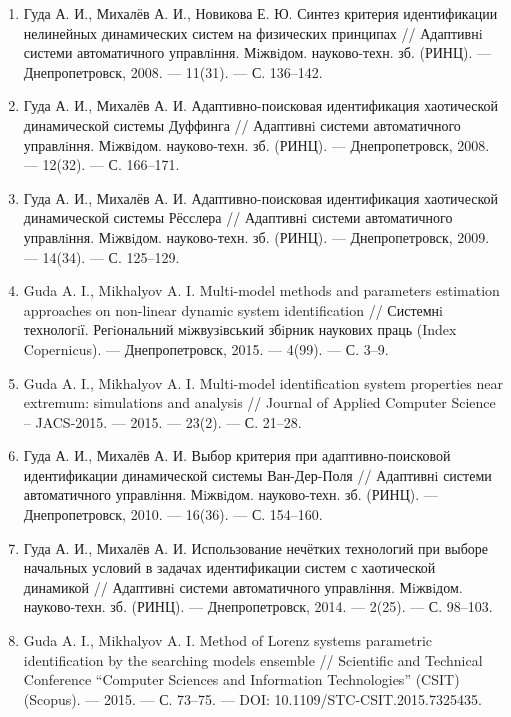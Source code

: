 \begin{enumerate}



\item
Гуда А. И., Михалёв А. И., Новикова Е. Ю. Синтез критерия идентификации нелинейных
динамических систем на физических принципах // Адаптивнi системи автоматичного
управлiння. Мiжвiдом. науково-техн. зб. (РИНЦ). --- Днепропетровск, 2008. --- 11(31). --- С. 136--142.

\item
Гуда А. И., Михалёв А. И. Адаптивно-поисковая идентификация хаотической динамической
системы Дуффинга // Адаптивнi системи автоматичного управлiння.
Мiжвiдом. науково-техн. зб. (РИНЦ). --- Днепропетровск, 2008. --- 12(32). --- С. 166--171.

\item
Гуда А. И., Михалёв А. И. Адаптивно-поисковая идентификация хаотической динамической
системы Рёсслера // Адаптивнi системи автоматичного управлiння. Мiжвiдом.
науково-техн. зб. (РИНЦ). --- Днепропетровск, 2009. --- 14(34). --- С. 125--129.

\item
Guda A. I., Mikhalyov A. I. Multi-model methods and parameters estimation approaches
on non-linear dynamic system identification // Системнi технологiї. Регiональний мiжвузiвський
збiрник наукових праць (Index Copernicus). --- Днепропетровск, 2015. --- 4(99). --- С. 3--9.

\item
Guda A. I., Mikhalyov A. I. Multi-model identification system properties near extremum:
simulations and analysis // Journal of Applied Computer Science – JACS-2015. --- 2015. --- 23(2). --- С. 21--28.

\item
Гуда А. И., Михалёв А. И. Выбор критерия при адаптивно-поисковой идентификации
динамической системы Ван-Дер-Поля // Адаптивнi системи автоматичного управлiння.
Мiжвiдом. науково-техн. зб. (РИНЦ). --- Днепропетровск, 2010. --- 16(36). --- С. 154--160.

\item
Гуда А. И., Михалёв А. И. Использование нечётких технологий при выборе начальных
условий в задачах идентификации систем с хаотической динамикой // Адаптивнi системи
автоматичного управлiння. Мiжвiдом. науково-техн. зб. (РИНЦ). --- Днепропетровск, 2014. --- 2(25). --- С. 98--103.

\item
Guda A. I., Mikhalyov A. I. Method of Lorenz systems parametric identification by the
searching models ensemble // Scientific and Technical Conference ``Computer Sciences and
Information Technologies'' (CSIT) (Scopus). --- 2015. --- С. 73--75. --- DOI: 10.1109/STC-CSIT.2015.7325435.


\end{enumerate}
